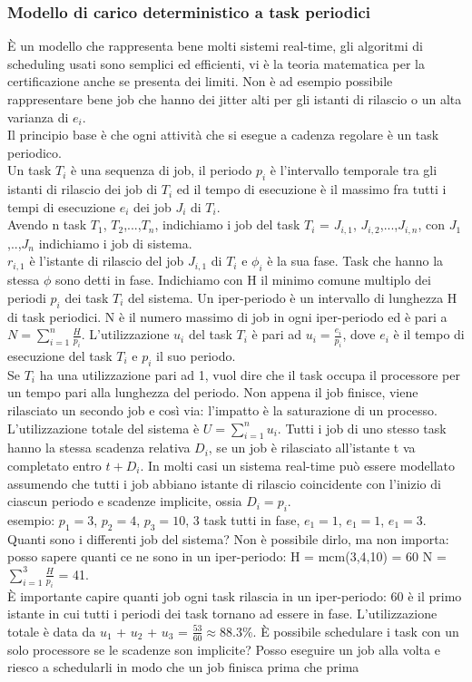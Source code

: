 \documentclass[12pt, oneside]{extbook}
\begin{document}
\subsubsection{Modello di carico deterministico a task periodici}
È un modello che rappresenta bene molti sistemi real-time, gli algoritmi di scheduling usati sono semplici ed efficienti, vi è la teoria matematica per la certificazione anche se presenta dei limiti. Non è ad esempio possibile rappresentare bene job che hanno dei jitter alti per gli istanti di rilascio o un alta varianza di $e_i$.\\ Il principio base è che ogni attività che si esegue a cadenza regolare è un task periodico.\\ Un task $T_i$ è una sequenza di job, il periodo $p_i$ è l'intervallo temporale tra gli istanti di rilascio dei job di $T_i$ ed il tempo di esecuzione è il massimo fra tutti i tempi di esecuzione $e_i$ dei job $J_i$ di $T_i$.\\ Avendo n task $T_1$, $T_2$,...,$T_n$, indichiamo i job del task $T_i$ = $J_{i,1}$, $J_{i,2}$,...,$J_{i,n}$, con $J_1$,..,$J_n$ indichiamo i job di sistema.\\ $r_{i,1}$ è l'istante di rilascio del job $J_{i,1}$ di $T_i$ e $\phi_i$ è la sua fase. Task che hanno la stessa $\phi$ sono detti in fase. Indichiamo con H il minimo comune multiplo dei periodi $p_i$ dei task $T_i$ del sistema. Un iper-periodo è un intervallo di lunghezza H di task periodici. N è il numero massimo di job in ogni iper-periodo ed è pari a $N = \sum\limits_{i=1}^{n} \frac{H}{p_i}$. L'utilizzazione $u_i$ del task $T_i$ è pari ad $u_i = \frac{e_i}{p_i}$, dove $e_i$ è il tempo di esecuzione del task $T_i$ e $p_i$ il suo periodo.\\ Se $T_i$ ha una utilizzazione pari ad 1, vuol dire che il task occupa il processore per un tempo pari alla lunghezza del periodo. Non appena il job finisce, viene rilasciato un secondo job e così via: l'impatto è la saturazione di un processo.\\ L'utilizzazione totale del sistema è $U = \sum\limits_{i=1}^{n} u_i$. Tutti i job di uno stesso task hanno la stessa scadenza relativa $D_i$, se un job è rilasciato all'istante t va completato entro $t + D_i$. In molti casi un sistema real-time può essere modellato assumendo che tutti i job abbiano istante di rilascio coincidente con l'inizio di ciascun periodo e scadenze implicite, ossia $D_i = p_i$.\\ esempio: $p_1 = 3$, $p_2 = 4$, $p_3 = 10$, 3 task tutti in fase, $e_1 = 1$, $e_1 = 1$, $e_1 = 3$. Quanti sono i differenti job del sistema? Non è possibile dirlo, ma non importa: posso sapere quanti ce ne sono in un iper-periodo: H = mcm(3,4,10) = 60  N = $\sum\limits_{i=1}^{3} \frac{H}{p_i}$ = 41.\\ È importante capire quanti job ogni task rilascia in un iper-periodo: 60 è il primo istante in cui tutti i periodi dei task tornano ad essere in fase. L'utilizzazione totale è data da $u_1$ + $u_2$ + $u_3$ = $\frac{53}{60} \approx 88.3\%$. È possibile schedulare i task con un solo processore se le scadenze son implicite? Posso eseguire un job alla volta e riesco a schedularli in modo che un job finisca prima che prima 
\end{document}
